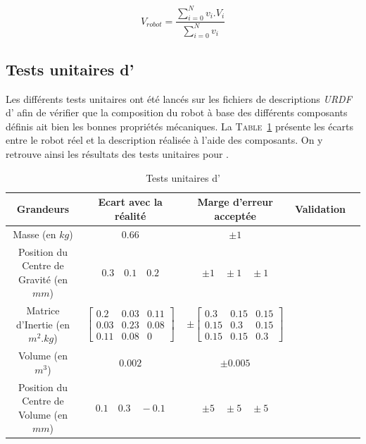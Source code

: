 				\begin{equation}
					V_{robot} = \frac{\sum_{i=0}^{N}v_i.V_i}{\sum_{i=0}^{N}v_i}
				\end{equation}


		\subsection{Tests unitaires d'\argos{}}

			Les différents tests unitaires ont été lancés sur les fichiers de descriptions \textit{URDF} d'\argos{} afin de vérifier que la composition du robot à base des différents composants définis ait bien les bonnes propriétés mécaniques. La \textsc{Table}~\ref{table:argos_unittest} présente les écarts entre le robot réel et la description réalisée à l'aide des composants. On y retrouve ainsi les résultats des tests unitaires pour \argos{}.
			
			\begin{table}[!htb]
				\centering
				\begin{adjustbox}{max width=\textwidth}
					\begin{tabular}{|c|c|c|c|c|}
						\hline
						\textbf{Grandeurs} & \textbf{Ecart avec la réalité} & \textbf{Marge d'erreur acceptée} & \textbf{Validation} \\
						\hline
						Masse (en $kg$) & $0.66$ & $\pm 1$ & \cmark \\
						\hline
						Position du Centre de Gravité (en $mm$) & $0.3 \quad 0.1 \quad 0.2$ & $\pm 1 \quad \pm 1 \quad \pm 1$ & \cmark \\
						\hline
						Matrice d'Inertie (en $m^2.kg$) & $\begin{bmatrix}0.2 & 0.03 & 0.11 \\ 0.03 & 0.23 & 0.08 \\ 0.11 & 0.08 & 0\end{bmatrix}$ & $\pm \begin{bmatrix}0.3 & 0.15 & 0.15 \\ 0.15 & 0.3 & 0.15 \\ 0.15 & 0.15 & 0.3\end{bmatrix}$ & \cmark \\
						\hline
						Volume (en $m^3$) & $0.002$ & $\pm 0.005$ & \cmark \\
						\hline
						Position du Centre de Volume (en $mm$) & $0.1 \quad 0.3 \quad -0.1$ & $\pm 5 \quad \pm 5 \quad \pm 5$ & \cmark \\
						\hline
					\end{tabular}
				\end{adjustbox}
				\caption{Tests unitaires d'\argos{}}
				\label{table:argos_unittest}
			\end{table}

